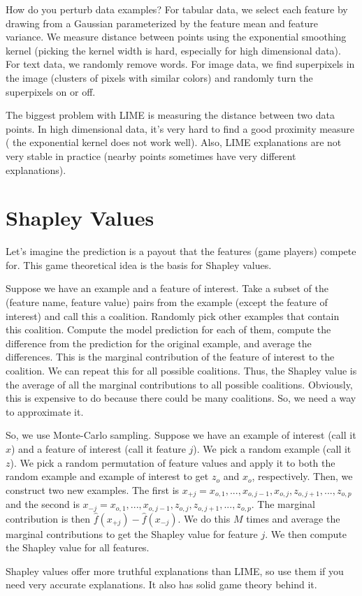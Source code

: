 \documentclass[a4paper]{article}
\begin{document}
How do you perturb data examples? For tabular data, we select each
feature by drawing from a Gaussian parameterized by the feature mean and feature
variance. We measure distance between points using the exponential smoothing
kernel (picking the kernel width is hard, especially for high dimensional data).
For text data, we randomly remove words. For image data, we find superpixels
in the image (clusters of pixels with similar colors) and randomly turn the
superpixels on or off.

The biggest problem with LIME is measuring the distance between two data points.
In high dimensional data, it's very hard to find a good proximity measure (
the exponential kernel does not work well). Also, LIME explanations are not
very stable in practice (nearby points sometimes have very different
explanations).


\section{Shapley Values}
Let's imagine the prediction is a payout that the features (game players)
compete for. This game theoretical idea is the basis for Shapley values.

Suppose we have an example and a feature of interest. Take a subset of
the (feature name, feature value) pairs from the example (except the feature
of interest) and call this a coalition. Randomly pick other examples that
contain this coalition. Compute the model prediction for each of them,
compute the difference from the prediction for the original example, and
average the differences. This is
the marginal contribution of the feature of interest to the coalition. We can
repeat this for all possible coalitions. Thus, the Shapley value is the average of
all the marginal contributions to all possible coalitions. Obviously, this
is expensive to do because there could be many coalitions. So, we need a way to
approximate it.

So, we use Monte-Carlo sampling. Suppose we have an example of interest (call it
$x$) and
a feature of interest (call it feature $j$).
We pick a random example (call it $z$). We pick a random
permutation of feature values and apply it to both the random example and
example of interest to get $z_o$ and $x_o$, respectively. Then, we construct
two new examples. The first is $x_{+j} = x_{o,1}, ..., x_{o,j-1}, x_{o,j},
z_{o,j+1}, ..., z_{o, p}$ and the second is $x_{-j} =
x_{o,1}, ..., x_{o,j-1}, z_{o,j}, z_{o,j+1}, ..., z_{o, p}$. The marginal
contribution is then $\hat{f}(x_{+j}) - \hat{f}(x_{-j})$. We do this $M$ times
and average the marginal contributions to get the Shapley value for feature $j$.
We then compute the Shapley value for all features.

Shapley values offer more truthful explanations than LIME, so use them if you
need very accurate explanations. It also has solid game theory behind it.
\end{document}
